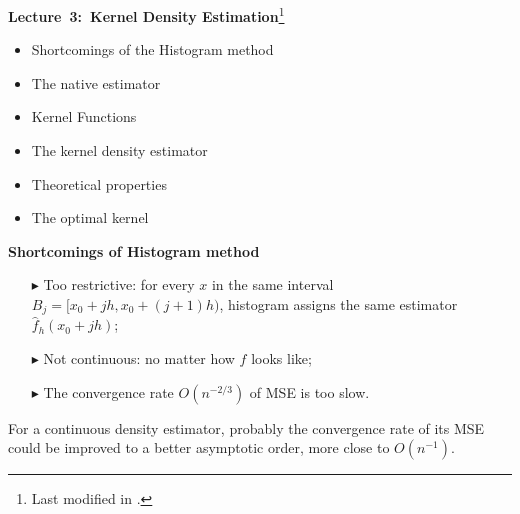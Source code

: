 \documentclass[19pt,landscape]{article}
\begin{document}
%

%

\newpage
{\LARGE\centerline{\textbf{Lecture~3:~Kernel Density Estimation}\footnote{Last modified in .}}}
\vskip25pt
\begin{minipage}{.9\textwidth}
    \Large
\begin{itemize}
\item Shortcomings of the Histogram method
\item The native estimator
\item Kernel Functions  
\item The kernel density estimator
\item Theoretical properties 
\item The optimal kernel

\end{itemize}
\end{minipage}
\newpage
{\Large\centerline{\textbf{Shortcomings of Histogram method}}}
\vskip25pt
\begin{minipage}{.9\textwidth}
    \Large
\begin{itemize}
    \item[$\blacktriangleright$] Too restrictive: for every $x$ in the same interval $B_j=[x_0+jh, x_0+(j+1)h)$, histogram assigns the same estimator $\hat{f}_h(x_0+jh)$;
    \item[$\blacktriangleright$] Not continuous: no matter how $f$ looks like;
    \item[$\blacktriangleright$] The convergence rate $O(n^{-2/3})$ of MSE is too slow.  
\end{itemize}
For a continuous density estimator, probably the convergence rate of its MSE could be improved to a better asymptotic order, more close to $O(n^{-1})$.
\end{minipage}
\end{document}
